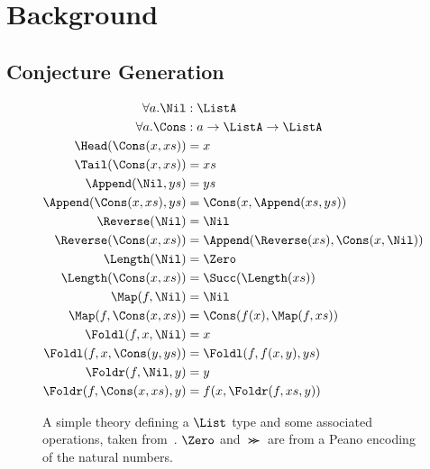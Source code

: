 \section{Background}

\subsection{Conjecture Generation}

\begin{figure}
  \begin{equation*}
    \begin{split}
      \forall a. \Nil            &: \ListA                                  \\
      \forall a. \Cons           &: a \rightarrow \ListA \rightarrow \ListA \\
      \Head(\Cons(x, xs))        &= x                                       \\
      \Tail(\Cons(x, xs))        &= xs                                      \\
      \Append(\Nil,         ys)  &= ys                                      \\
      \Append(\Cons(x, xs), ys)  &= \Cons(x, \Append(xs, ys))               \\
      \Reverse(\Nil)             &= \Nil                                    \\
      \Reverse(\Cons(x, xs))     &= \Append(\Reverse(xs), \Cons(x, \Nil))   \\
      \Length(\Nil)              &= \Zero                                   \\
      \Length(\Cons(x, xs))      &= \Succ (\Length(xs))                     \\
      \Map(f, \Nil)              &= \Nil                                    \\
      \Map(f, \Cons(x, xs))      &= \Cons(f(x), \Map(f, xs))                \\
      \Foldl(f, x, \Nil)         &= x                                       \\
      \Foldl(f, x, \Cons(y, ys)) &= \Foldl(f, f(x, y), ys)                  \\
      \Foldr(f, \Nil,         y) &= y                                       \\
      \Foldr(f, \Cons(x, xs), y) &= f(x, \Foldr(f, xs, y))
    \end{split}
  \end{equation*}
  \caption{A simple theory defining a $\List$ type and some associated
    operations, taken from~\cite{Johansson.Dixon.Bundy:conjecture-generation}.
    $\Zero$ and $\Succ$ are from a Peano encoding of the natural numbers.}
  \label{figure:list_theory}
\end{figure}

